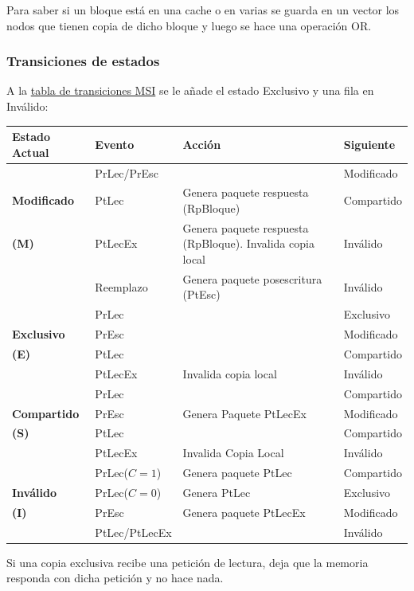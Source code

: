 \documentclass[10pt,a4paper,spanish]{report}
\begin{document}
Para saber si un bloque está en una cache o en varias se guarda en un vector los nodos que tienen copia de dicho bloque y luego se hace una operación OR.

\textcolor[rgb]{0.2,0.4,0.8}{\subsubsection{Transiciones de estados}}
A la \hyperref[trans_msi]{tabla de transiciones MSI} se le añade el estado Exclusivo y una fila en Inválido:

\begin{tabular}{|p{2.5cm}|p{2.2cm}|p{7cm}|p{2.5cm}|}
\hline
\textbf{Estado Actual} & \textbf{Evento} & \textbf{Acción} & \textbf{Siguiente} \\
\hline
& PrLec/PrEsc & & Modificado \\ \cline{2-4}
\textbf{Modificado} & PtLec & Genera paquete respuesta (RpBloque) & Compartido \\ \cline{2-4}
\textbf{(M)} & PtLecEx & Genera paquete respuesta (RpBloque). Invalida copia local & Inválido \\ \cline{2-4}
& Reemplazo & Genera paquete posescritura (PtEsc) & Inválido \\
\hline
& PrLec & & Exclusivo \\ \cline{2-4}
\textbf{Exclusivo} & PrEsc & & Modificado \\ \cline{2-4}
\textbf{(E)} & PtLec & & Compartido \\ \cline{2-4}
& PtLecEx & Invalida copia local & Inválido \\
\hline
& PrLec & & Compartido \\ \cline{2-4}
\textbf{Compartido} & PrEsc & Genera Paquete PtLecEx & Modificado \\ \cline{2-4}
\textbf{(S)} & PtLec & & Compartido \\ \cline{2-4}
& PtLecEx & Invalida Copia Local & Inválido \\
\hline
& PrLec($C=1$) & Genera paquete PtLec & Compartido \\ \cline{2-4}
\textbf{Inválido} & PrLec($C=0$) & Genera PtLec & Exclusivo \\ \cline{2-4}
\textbf{(I)} & PrEsc & Genera paquete PtLecEx & Modificado \\ \cline{2-4}
& PtLec/PtLecEx & & Inválido \\
\hline
\end{tabular}

Si una copia exclusiva recibe una petición de lectura, deja que la memoria responda con dicha petición y no hace nada. 
\end{document}
